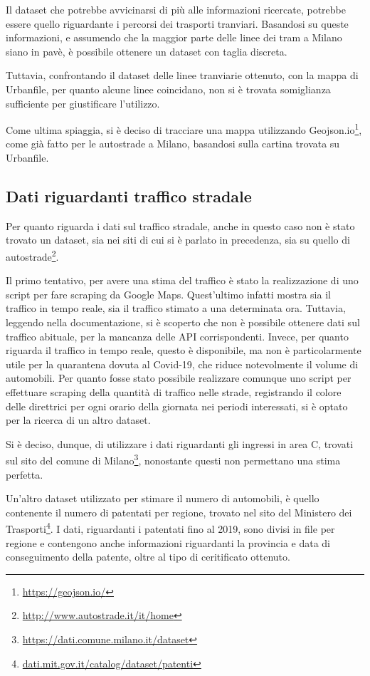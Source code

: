 \documentclass[a4paper,12pt]{report}
\begin{document}
Il dataset che potrebbe avvicinarsi di più alle informazioni ricercate, 
potrebbe essere quello riguardante i percorsi dei trasporti tranviari. 
Basandosi su queste informazioni, e assumendo che la maggior parte delle linee dei 
tram a Milano siano in pavè, è possibile ottenere un dataset con taglia discreta.

Tuttavia, confrontando il dataset delle linee tranviarie ottenuto, 
con la mappa di Urbanfile, per quanto alcune linee coincidano, non si è trovata 
somiglianza sufficiente per giustificare l'utilizzo.

Come ultima spiaggia, si è deciso di tracciare una mappa utilizzando 
Geojson.io\footnote{\url{https://geojson.io/}}, come già fatto per le autostrade a Milano, 
basandosi sulla cartina trovata su Urbanfile. 

\subsection{Dati riguardanti traffico stradale}

Per quanto riguarda i dati sul traffico stradale, anche in questo caso non è stato trovato un 
dataset, sia nei siti di cui si è parlato in precedenza, sia su quello di 
autostrade\footnote{\url{http://www.autostrade.it/it/home}}.

Il primo tentativo, per avere una stima del traffico è stato la realizzazione di uno 
script per fare scraping da Google Maps. 
Quest'ultimo infatti mostra sia il traffico in tempo reale, sia 
il traffico stimato a una determinata ora. 
Tuttavia, leggendo nella documentazione, si è scoperto che non è possibile ottenere 
dati sul traffico abituale, per la mancanza delle API corrispondenti. 
Invece, per quanto riguarda il traffico in tempo 
reale, questo è disponibile, ma non è particolarmente utile per la quarantena dovuta al 
Covid-19, che riduce notevolmente il volume di automobili. 
Per quanto fosse stato possibile realizzare comunque uno script per effettuare scraping della 
quantità di traffico nelle strade, registrando il colore delle direttrici per ogni orario della 
giornata nei periodi interessati, si è optato per la ricerca di un altro dataset.

Si è deciso, dunque, di utilizzare i dati riguardanti gli ingressi in area C, 
trovati sul sito del comune di Milano\footnote{\url{https://dati.comune.milano.it/dataset}}, 
nonostante questi non permettano una stima perfetta.

Un'altro dataset utilizzato per stimare il numero di automobili, è quello contenente 
il numero di patentati per regione, trovato nel sito del Ministero dei 
Trasporti\footnote{\url{dati.mit.gov.it/catalog/dataset/patenti}}.
I dati, riguardanti i patentati fino al 2019, sono divisi in file per regione e 
contengono anche informazioni riguardanti la provincia e data di conseguimento della 
patente, oltre al tipo di ceritificato ottenuto.
\end{document}
